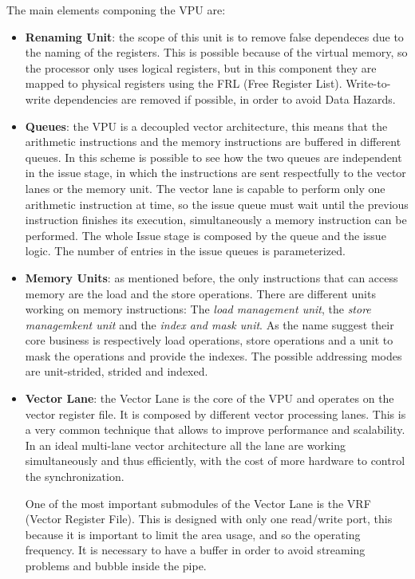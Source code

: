 The main elements componing the VPU are:
\begin{itemize}
    \item \textbf{Renaming Unit}: the scope of this unit is to remove false dependeces due to the naming of the registers. This is possible because of the virtual memory, so the processor only uses logical registers, but in this component they are mapped to physical registers using the FRL (Free Register List).
    Write-to-write dependencies are removed if possible, in order to avoid Data Hazards.
 
    \item \textbf{Queues}: the VPU is a decoupled vector architecture, this means that the arithmetic instructions and the memory instructions are buffered in different queues.
    In this scheme is possible to see how the two queues are independent in the issue stage, in which the instructions are sent respectfully to the vector lanes or the memory unit.
    The vector lane is capable to perform only one arithmetic instruction at time, so the issue queue must wait until the previous instruction finishes its execution, simultaneously a memory instruction can be performed.
    The whole Issue stage is composed by the queue and the issue logic. The number of entries in the issue queues is parameterized.
    
    \item \textbf{Memory Units}: as mentioned before, the only instructions that can access memory are the load and the store operations. There are different units working on memory instructions: The \emph{load management unit}, the \emph{store managemkent unit} and the \emph{index and mask unit}. As the name suggest their core business is respectively load operations, store operations and a unit to mask the operations and provide the indexes.
    The possible addressing modes are unit-strided, strided and indexed.
    

    
    \item \textbf{Vector Lane}: the Vector Lane is the core of the VPU and operates on the vector register file. It is composed by different vector processing lanes. This is a very common technique that allows to improve performance and scalability.
    In an ideal multi-lane vector architecture all the lane are working simultaneously and thus efficiently, with the cost of more hardware to control the synchronization.
    
    One of the most important submodules of the Vector Lane is the VRF (Vector Register File). This is designed with only one read/write port, this because it is important to limit the area usage, and so the operating frequency. It is necessary to have a buffer in order to avoid streaming problems and bubble inside the pipe.
    

\end{itemize}
